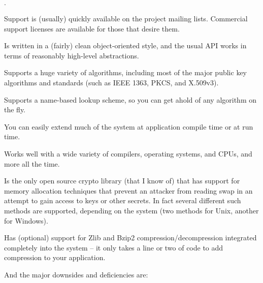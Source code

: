 \documentclass{article}
\begin{document}
\begin{list}{$\cdot$}
  \item Support is (usually) quickly available on the project mailing lists.
        Commercial support licenses are available for those that desire them.

  \item
  \item Is written in a (fairly) clean object-oriented style, and the usual
        API works in terms of reasonably high-level abstractions.

  \item Supports a huge variety of algorithms, including most of the major
        public key algorithms and standards (such as IEEE 1363, PKCS, and
        X.509v3).

  \item Supports a name-based lookup scheme, so you can get ahold of any
        algorithm on the fly.

  \item You can easily extend much of the system at application compile time or
        at run time.

  \item Works well with a wide variety of compilers, operating systems, and
        CPUs, and more all the time.

  \item Is the only open source crypto library (that I know of) that has
        support for memory allocation techniques that prevent an attacker from
        reading swap in an attempt to gain access to keys or other secrets. In
        fact several different such methods are supported, depending on the
        system (two methods for Unix, another for Windows).

  \item Has (optional) support for Zlib and Bzip2 compression/decompression
        integrated completely into the system -- it only takes a line or two of
        code to add compression to your application.
\end{list}

\noindent
And the major downsides and deficiencies are:
\end{document}
